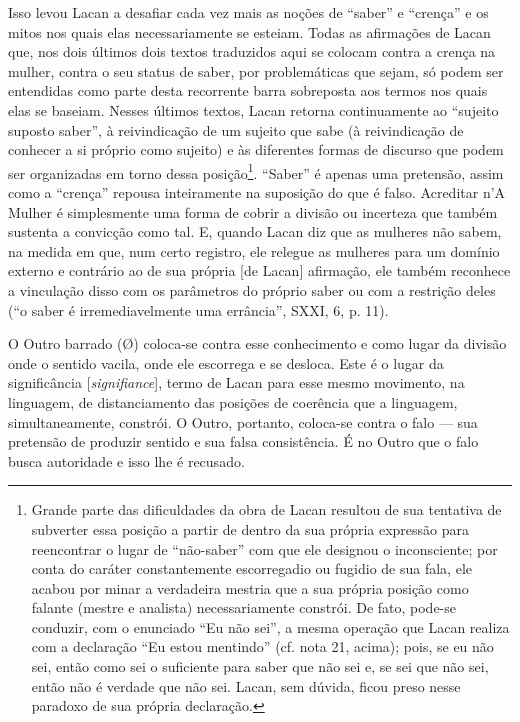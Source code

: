 Isso levou Lacan a desafiar cada vez mais as noções de ``saber'' e
``crença'' e os mitos nos quais elas necessariamente se esteiam. Todas
as afirmações de Lacan que, nos dois últimos dois textos traduzidos aqui
se colocam contra a crença na mulher, contra o seu status de saber, por
problemáticas que sejam, só podem ser entendidas como parte desta
recorrente barra sobreposta aos termos nos quais elas se baseiam. Nesses
últimos textos, Lacan retorna continuamente ao ``sujeito suposto
saber'', à reivindicação de um sujeito que sabe (à reivindicação de
conhecer a si próprio como sujeito) e às diferentes formas de discurso
que podem ser organizadas em torno dessa posição\footnote{Grande parte
  das dificuldades da obra de Lacan resultou de sua tentativa de
  subverter essa posição a partir de dentro da sua própria expressão
  para reencontrar o lugar de ``não-saber'' com que ele designou o
  inconsciente; por conta do caráter constantemente escorregadio ou
  fugidio de sua fala, ele acabou por minar a verdadeira mestria que a
  sua própria posição como falante (mestre e analista) necessariamente
  constrói. De fato, pode-se conduzir, com o enunciado ``Eu não sei'', a
  mesma operação que Lacan realiza com a declaração ``Eu estou
  mentindo'' (cf. nota 21, acima); pois, se eu não sei, então como sei o
  suficiente para saber que não sei e, se sei que não sei, então não é
  verdade que não sei. Lacan, sem dúvida, ficou preso nesse paradoxo de
  sua própria declaração.}. ``Saber'' é apenas uma pretensão, assim como
a ``crença'' repousa inteiramente na suposição do que é falso. Acreditar
n'A Mulher é simplesmente uma forma de cobrir a divisão ou incerteza que
também sustenta a convicção como tal. E, quando Lacan diz que as
mulheres não sabem, na medida em que, num certo registro, ele relegue as
mulheres para um domínio externo e contrário ao de sua própria {[}de
Lacan{]} afirmação, ele também reconhece a vinculação disso com os
parâmetros do próprio saber ou com a restrição deles (``o saber é
irremediavelmente uma errância'', SXXI, 6, p. 11).

O Outro barrado (Ø) coloca-se contra esse conhecimento e como lugar da
divisão onde o sentido vacila, onde ele escorrega e se desloca. Este é o
lugar da significância {[}\emph{signifiance}{]}, termo de Lacan para
esse mesmo movimento, na linguagem, de distanciamento das posições de
coerência que a linguagem, simultaneamente, constrói. O Outro, portanto,
coloca-se contra o falo --- sua pretensão de produzir sentido e sua falsa
consistência. É no Outro que o falo busca autoridade e isso lhe é
recusado.

